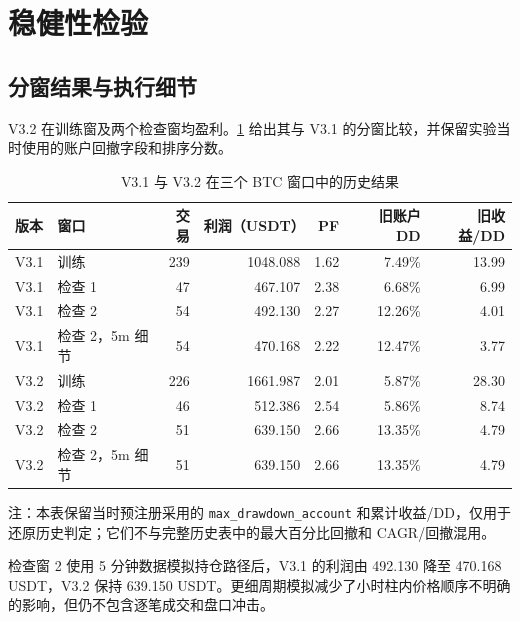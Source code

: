 \section{稳健性检验}

\subsection{分窗结果与执行细节}

V3.2 在训练窗及两个检查窗均盈利。\cref{tab:v31-v32-windows} 给出其与 V3.1 的分窗比较，并保留实验当时使用的账户回撤字段和排序分数。

\begin{table}[H]
  \centering
  \caption{V3.1 与 V3.2 在三个 BTC 窗口中的历史结果}
  \label{tab:v31-v32-windows}
  \begin{threeparttable}
    \begin{tabular}{llrrrrr}
      \toprule
      版本 & 窗口 & 交易 & 利润（USDT） & PF & 旧账户 DD & 旧收益/DD\\
      \midrule
      V3.1 & 训练 & 239 & 1048.088 & 1.62 & 7.49\% & 13.99\\
      V3.1 & 检查 1 & 47 & 467.107 & 2.38 & 6.68\% & 6.99\\
      V3.1 & 检查 2 & 54 & 492.130 & 2.27 & 12.26\% & 4.01\\
      V3.1 & 检查 2，5m 细节 & 54 & 470.168 & 2.22 & 12.47\% & 3.77\\
      \midrule
      V3.2 & 训练 & 226 & 1661.987 & 2.01 & 5.87\% & 28.30\\
      V3.2 & 检查 1 & 46 & 512.386 & 2.54 & 5.86\% & 8.74\\
      V3.2 & 检查 2 & 51 & 639.150 & 2.66 & 13.35\% & 4.79\\
      V3.2 & 检查 2，5m 细节 & 51 & 639.150 & 2.66 & 13.35\% & 4.79\\
      \bottomrule
    \end{tabular}
    \begin{tablenotes}[flushleft]\footnotesize
      \item 注：本表保留当时预注册采用的 \texttt{max\_drawdown\_account} 和累计收益/DD，仅用于还原历史判定；它们不与完整历史表中的最大百分比回撤和 CAGR/回撤混用。
    \end{tablenotes}
  \end{threeparttable}
\end{table}

检查窗 2 使用 5 分钟数据模拟持仓路径后，V3.1 的利润由 492.130 降至 470.168 USDT，V3.2 保持 639.150 USDT。更细周期模拟减少了小时柱内价格顺序不明确的影响，但仍不包含逐笔成交和盘口冲击。

